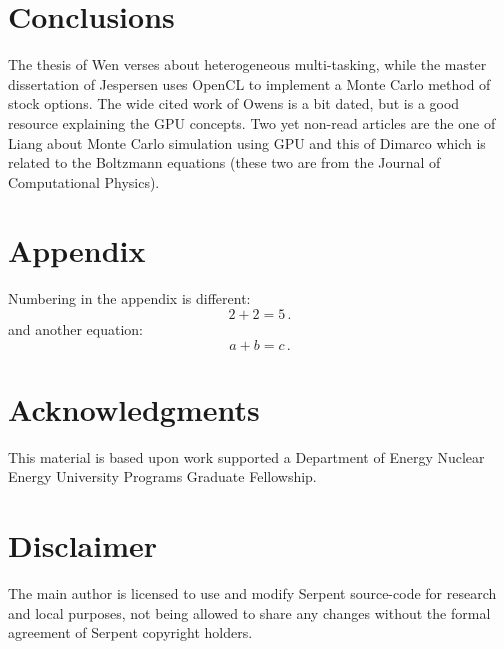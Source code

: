 \documentclass[twoside,a4paper,12pt,english]{anstrans}
\begin{document}
\section{Conclusions}

The thesis of Wen \cite{Wen2017} verses about heterogeneous multi-tasking, while
the master dissertation of Jespersen \cite{Jespersen2015} uses OpenCL to implement
a Monte Carlo method of stock options. The wide cited work of Owens \cite{Owens2007}
is a bit dated, but is a good resource explaining the GPU concepts. Two yet non-read articles
are the one of Liang \cite{Liang2017} about Monte Carlo simulation using GPU and this of Dimarco
\cite{Dimarco2017} which is related to the Boltzmann equations (these two are from the Journal
of Computational Physics).

\appendix
\section{Appendix}

Numbering in the appendix is different:
\begin{equation} \label{eq:appendix}
  2 + 2 = 5\,.
\end{equation}
and another equation:
\begin{equation} \label{eq:appendix2}
  a + b = c\,.
\end{equation}

\section{Acknowledgments}
This material is based upon work supported a Department of Energy Nuclear
Energy University Programs Graduate Fellowship.

\section{Disclaimer}
The main author is licensed to use and modify Serpent source-code for research
and local purposes, not being allowed to share any changes without the formal
agreement of Serpent copyright holders.


\end{document}
